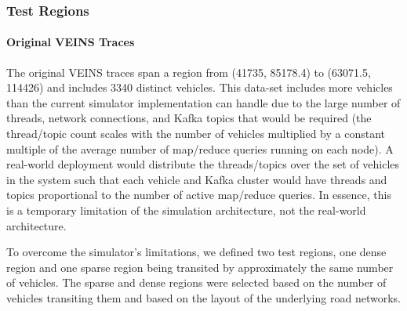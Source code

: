 \documentclass{thesis}
\begin{document}

\subsubsection{Test Regions} %
    \paragraph{Original VEINS Traces} %
        The original VEINS traces span a region from (41735, 85178.4) to (63071.5, 114426) and includes 3340 distinct
        vehicles. This data-set includes more vehicles than the current simulator implementation can handle due to the large
        number of threads, network connections, and Kafka topics that would be required (the thread/topic count scales with the
        number of vehicles multiplied by a constant multiple of the average number of map/reduce queries running on each node).
        A real-world deployment would distribute the threads/topics over the set of vehicles in the system such that each
        vehicle and Kafka cluster would have threads and topics proportional to the number of active map/reduce queries.
        In essence, this is a temporary limitation of the simulation architecture, not the real-world architecture.

        To overcome the simulator's limitations, we defined two test regions, one dense region and one sparse region
        being transited by approximately the same number of vehicles. The sparse and dense regions were selected based
        on the number of vehicles transiting them and based on the layout of the underlying road networks.
\end{document}
